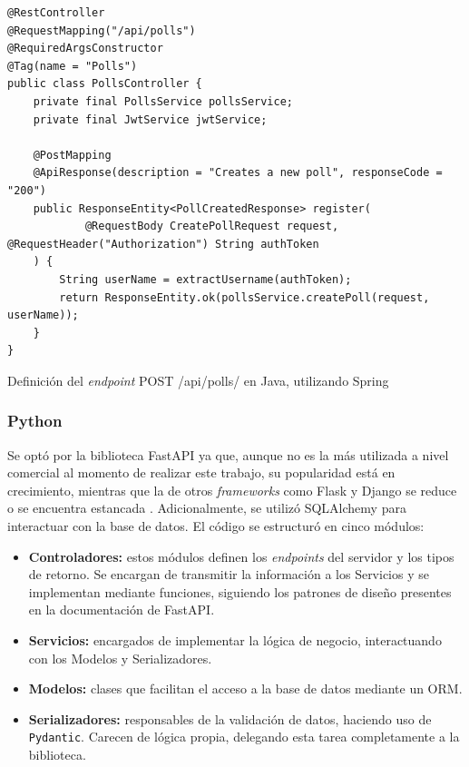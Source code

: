 \documentclass[11pt]{article}
\let\Oldsubsubsection\subsubsection
\renewcommand{\subsubsection}{\FloatBarrier\Oldsubsubsection}
\newcommand{\english}[1]{\textit{#1}}
\begin{document}
\begin{listing}
\begin{verbatim}
@RestController
@RequestMapping("/api/polls")
@RequiredArgsConstructor
@Tag(name = "Polls")
public class PollsController {
    private final PollsService pollsService;
    private final JwtService jwtService;

    @PostMapping
    @ApiResponse(description = "Creates a new poll", responseCode = "200")
    public ResponseEntity<PollCreatedResponse> register(
            @RequestBody CreatePollRequest request, @RequestHeader("Authorization") String authToken
    ) {
        String userName = extractUsername(authToken);
        return ResponseEntity.ok(pollsService.createPoll(request, userName));
    }
}
\end{verbatim}
\caption{Definición del \english{endpoint} POST /api/polls/ en Java, utilizando Spring}
\label{code:http_java_endpoint}
\end{listing}

\subsubsection{Python}

Se optó por la biblioteca FastAPI ya que, aunque no es la más utilizada a nivel comercial al momento de realizar este trabajo, su popularidad está en crecimiento, mientras que la de otros \textit{frameworks} como Flask y Django se reduce o se encuentra estancada \cite{http:python_survey}. Adicionalmente, se utilizó SQLAlchemy para interactuar con la base de datos. El código se estructuró en cinco módulos:

\begin{itemize}
    \item \textbf{Controladores:} estos módulos definen los \textit{endpoints} del servidor y los tipos de retorno. Se encargan de transmitir la información a los Servicios y se implementan mediante funciones, siguiendo los patrones de diseño presentes en la documentación de FastAPI.
    \item \textbf{Servicios:} encargados de implementar la lógica de negocio, interactuando con los Modelos y Serializadores.
    \item \textbf{Modelos:} clases que facilitan el acceso a la base de datos mediante un ORM.
    \item \textbf{Serializadores:} responsables de la validación de datos, haciendo uso de \lstinline{Pydantic}. Carecen de lógica propia, delegando esta tarea completamente a la biblioteca.
\end{itemize}
\end{document}
